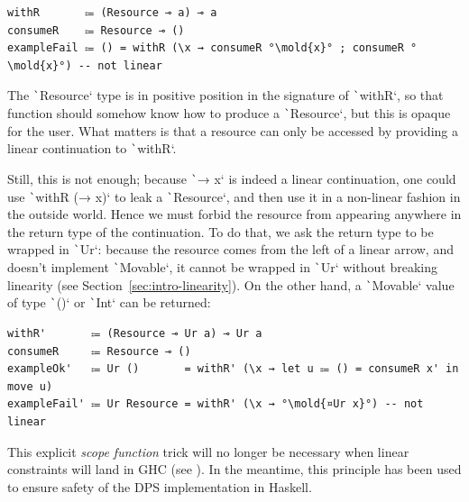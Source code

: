 \documentclass[english]{jflart}
\newcommand{\mold}[1]{\colorbox{red!50}{#1}}
\newlength{\currentparskip}
\newenvironment{unbreakable}
{%
  \setlength{\currentparskip}{\parskip}%
  \setlength{\parskip}{\currentparskip}%
  \par\vspace{0.5\baselineskip}%
  \noindent\begin{minipage}{\textwidth}%
    \setlength{\parskip}{\currentparskip}%
}
{%
  \end{minipage}%
  \par\vspace{0.5\baselineskip}%
}
\begin{document}
\begin{unbreakable}
{\small
\begin{verbatim}
withR       ⩴ (Resource ⊸ a) ⊸ a
consumeR    ⩴ Resource ⊸ ()
exampleFail ⩴ () = withR (\x → consumeR °\mold{x}° ; consumeR °\mold{x}°) -- not linear
\end{verbatim}
}
\end{unbreakable}

The \texttt`Resource` type is in positive position in the signature of \texttt`withR`, so that function should somehow know how to produce a \texttt`Resource`, but this is opaque for the user. What matters is that a resource can only be accessed by providing a linear continuation to \texttt`withR`.

Still, this is not enough; because \texttt`\x → x` is indeed a linear continuation, one could use \texttt`withR (\x → x)` to leak a \texttt`Resource`, and then use it in a non-linear fashion in the outside world. Hence we must forbid the resource from appearing anywhere in the return type of the continuation. To do that, we ask the return type to be wrapped in \texttt`Ur`: because the resource comes from the left of a linear arrow, and doesn't implement \texttt`Movable`, it cannot be wrapped in \texttt`Ur` without breaking linearity (see Section~\ref{sec:intro-linearity}). On the other hand, a \texttt`Movable` value of type \texttt`()` or \texttt`Int` can be returned:
\begin{unbreakable}
{\small
\begin{verbatim}
withR'       ⩴ (Resource ⊸ Ur a) ⊸ Ur a
consumeR     ⩴ Resource ⊸ ()
exampleOk'   ⩴ Ur ()       = withR' (\x → let u ⩴ () = consumeR x' in move u)
exampleFail' ⩴ Ur Resource = withR' (\x → °\mold{¤Ur x}°) -- not linear
\end{verbatim}
}
\end{unbreakable}

This explicit \emph{scope function} trick will no longer be necessary when linear constraints will land in GHC (see \cite{spiwack_linearly_2022}). In the meantime, this principle has been used to ensure safety of the DPS implementation in Haskell.

\end{document}
